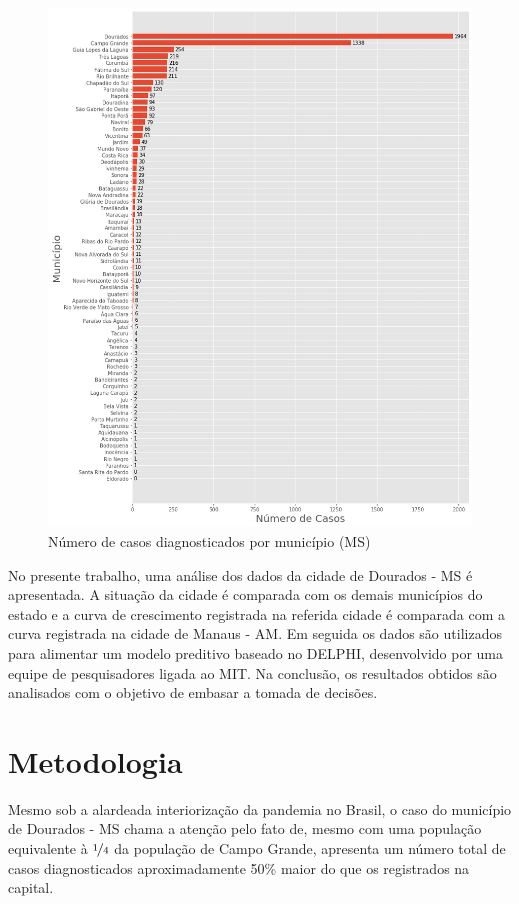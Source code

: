 \documentclass[12pt]{article}
\begin{document}
\begin{figure}[!htb]
  \centering
  \includegraphics[width=1\textwidth]{figs/casos_por_municipio.png}
  \caption{Número de casos diagnosticados por município (MS)}
  \label{fig:casosMuni}
  \end{figure}

No presente trabalho, uma análise dos dados da cidade de Dourados - MS é apresentada. A situação da cidade é comparada com os demais municípios do estado e a curva de crescimento registrada na referida cidade é comparada com a curva registrada na cidade de Manaus - AM. Em seguida os dados são utilizados para alimentar um modelo preditivo baseado no DELPHI, desenvolvido por uma equipe de pesquisadores ligada ao MIT. Na conclusão, os resultados obtidos são analisados com o objetivo de embasar a tomada de decisões.

\section{Metodologia}\label{sec:met}

Mesmo sob a alardeada interiorização da pandemia no Brasil, o caso do município de Dourados - MS chama a atenção pelo fato de, mesmo com uma população equivalente à \(\nicefrac{1}{4}\) da população de Campo Grande, apresenta um número total de casos diagnosticados aproximadamente 50\% maior do que os registrados na capital.
\end{document}
